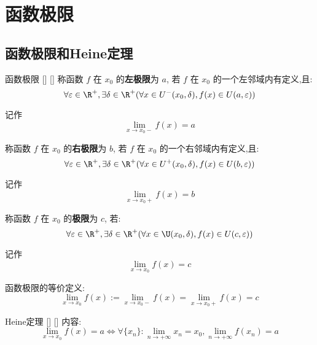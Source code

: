 \documentclass[UTF8]{ctexart}
\begin{document}
	\section{函数极限}
	
		\subsection{函数极限和Heine定理}
		
			\begin{dfn}
			    []
			    {函数极限}
			    []
			    []
				称函数 \(f\) 在 \(x_0\) 的\textbf{左极限}为 \(a\), 若 \(f\) 在 \(x_0\) 的一个左邻域内有定义,且: 
				\[\forall\varepsilon\in\R^+, \exists\delta\in\R^+(\forall x\in U^-(x_0,\delta), f(x)\in U(a,\varepsilon))\]
				
				记作
				\[\lim_{x\to x_0-}f(x)=a\]
				
				称函数 \(f\) 在 \(x_0\) 的\textbf{右极限}为 \(b\), 若 \(f\) 在 \(x_0\) 的一个右邻域内有定义,且: 
				\[\forall\varepsilon\in\R^+, \exists\delta\in\R^+(\forall x\in U^+(x_0,\delta), f(x)\in U(b,\varepsilon))\]
				
				记作
				\[\lim_{x\to x_0+}f(x)=b\]
				
				称函数 \(f\) 在 \(x_0\) 的\textbf{极限}为 \(c\), 若: 
				\[\forall\varepsilon\in\R^+, \exists\delta\in\R^+(\forall x\in\U(x_0,\delta), f(x)\in U(c,\varepsilon))\]
				
				记作
				\[\lim_{x\to x_0}f(x)=c\]

				函数极限的等价定义: 
				\[\lim_{x\to x_0}f(x):=\lim_{x\to x_0-}f(x)=\lim_{x\to x_0+}f(x)=c\]
			\end{dfn}
			
			\begin{thm}
			    []
			    {Heine定理}
			    []
			    []
				内容: 
				\[\lim_{x\to x_0}f(x)=a\iff\forall\{x_n\}: \lim_{n\to+\infty} x_n=x_0, \lim_{n\to+\infty} f(x_n)=a\]
			\end{thm}
\end{document}
